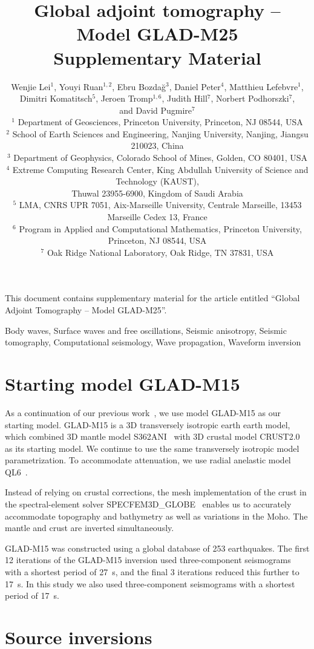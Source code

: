 \documentclass[extra,mreferee]{gji}
\title[Global Adjoint Tomography -- Model GLAD-M25 (Supplementary Material)]
  {Global adjoint tomography -- Model GLAD-M25 \\ Supplementary Material}
\author[Lei et al.]
  {Wenjie Lei$^1$, Youyi Ruan$^{1,2}$, Ebru Bozda\u g$^3$, Daniel Peter$^4$, Matthieu Lefebvre$^1$, \\{\LARGE \rm Dimitri Komatitsch$^5$, Jeroen Tromp$^{1,6}$, Judith Hill$^7$, Norbert Podhorszki$^7$}, \\ {\LARGE \rm and David Pugmire$^7$} \\
  $^1$ Department of Geosciences, Princeton University, Princeton, NJ 08544, USA\\
  $^2$ School of Earth Sciences and Engineering, Nanjing University, Nanjing, Jiangsu 210023, China\\
  $^3$ Department of Geophysics, Colorado School of Mines, Golden, CO 80401, USA\\
  $^4$ Extreme Computing Research Center, King Abdullah University of Science and Technology (KAUST), \\Thuwal 23955-6900, Kingdom of Saudi Arabia\\
  $^5$ LMA, CNRS UPR 7051, Aix-Marseille University, Centrale Marseille, 13453 Marseille Cedex 13, France\\
  $^6$ Program in Applied and Computational Mathematics, Princeton University, Princeton, NJ 08544, USA\\
  $^7$ Oak Ridge National Laboratory, Oak Ridge, TN 37831, USA\\
  }
\begin{document}
\maketitle

%
%
\begin{summary}
This document contains supplementary material for the article entitled ``Global Adjoint Tomography -- Model GLAD-M25''.
\end{summary}

\begin{keywords}
Body waves, Surface waves and free oscillations, Seismic anisotropy, Seismic tomography, Computational seismology, Wave propagation, Waveform inversion
\end{keywords}

\section{Starting model GLAD-M15}
\label{section:start}

As a continuation of our previous work~\citep{bozdaug2016global},
we use model GLAD-M15 as our
starting model.
GLAD-M15 is a 3D transversely isotropic earth earth model, which combined
3D mantle model S362ANI~\citep{kustowski2008anisotropic}
with 3D crustal model CRUST2.0~\citep{bassin2000current} as its starting model.
We continue to use the same transversely isotropic model parametrization.
To accommodate attenuation,
we use radial anelastic model QL6~\citep{QL6}.

Instead of relying on crustal corrections,
the mesh implementation of the crust in the spectral-element solver SPECFEM3D\_GLOBE~\citep{KoTr02a,KoTr02b,PeKoLuMaLeCaLeMaLiBlNiBaTr11} enables us to accurately accommodate topography and bathymetry as well as variations in the Moho.
The mantle and crust are inverted simultaneously.

GLAD-M15 was constructed using a global database of 253 earthquakes.
The first 12 iterations of the GLAD-M15 inversion used three-component seismograms with a shortest period of 27~s,
and the final 3 iterations reduced this further to 17~s.
In this study we also used three-component seismograms with a shortest period of 17~s.

\section{Source inversions}
\label{section:earthquakes}
\end{document}
